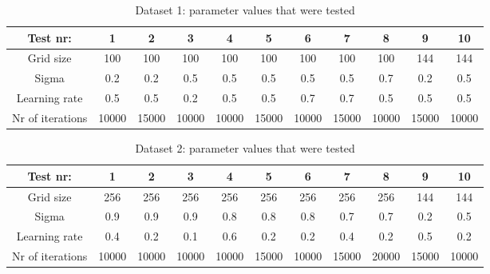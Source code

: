\documentclass[12pt]{report}
\begin{document}
	\begin{table}[H]
		\centering
		\begin{tabular}{|c|c|c|c|c|c|c|c|c|c|c|}
			\hline
			Test nr:& 1 & 2 & 3 & 4 & 5 & 6 & 7 & 8 & 9 & 10 \\
			\hline
			Grid size & 100 & 100 & 100 & 100 & 100 & 100 & 100 & 100 & 144 & 144 \\
			\hline
			Sigma & 0.2 & 0.2 & 0.5 & 0.5 & 0.5 & 0.5 & 0.5 & 0.7 & 0.2 & 0.5 \\
			\hline
			Learning rate & 0.5 & 0.5 & 0.2 & 0.5 & 0.5 & 0.7 & 0.7 & 0.5 & 0.5 & 0.5 \\
			\hline
			Nr of iterations & 10000 & 15000 & 10000 & 10000 & 15000 & 10000 & 15000 & 10000 & 15000 & 10000 \\
			\hline
		\end{tabular}
		\caption{Dataset 1: parameter values that were tested}
		\label{Dataset1SOMParameterValues}
	\end{table}

	\begin{table}[H]
		\centering
		\begin{tabular}{|c|c|c|c|c|c|c|c|c|c|c|}
			\hline
			Test nr:& 1 & 2 & 3 & 4 & 5 & 6 & 7 & 8 & 9 & 10 \\
			\hline
			Grid size & 256 & 256 & 256 & 256 & 256 & 256 & 256 & 256 & 144 & 144 \\
			\hline
			Sigma & 0.9 & 0.9 & 0.9 & 0.8 & 0.8 & 0.8 & 0.7 & 0.7 & 0.2 & 0.5 \\
			\hline
			Learning rate & 0.4 & 0.2 & 0.1 & 0.6 & 0.2 & 0.2 & 0.4 & 0.2 & 0.5 & 0.2 \\
			\hline
			Nr of iterations & 10000 & 10000 & 10000 & 10000 & 15000 & 10000 & 15000 & 20000 & 15000 & 10000 \\
			\hline
		\end{tabular}
		\caption{Dataset 2: parameter values that were tested}
		\label{Dataset2SOMParameterValues}
	\end{table}
\end{document}
